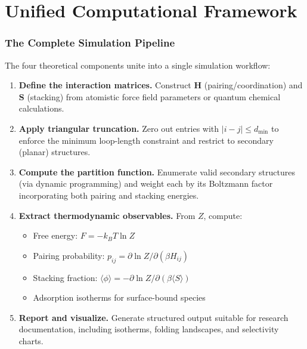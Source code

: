 \documentclass[11pt]{article}
\begin{document}
\part{Unified Computational Framework}

\section{The Complete Simulation Pipeline}

The four theoretical components unite into a single simulation workflow:

\begin{enumerate}
  \item \textbf{Define the interaction matrices.}
        Construct $\mathbf{H}$ (pairing/coordination) and $\mathbf{S}$
        (stacking) from atomistic force field parameters or quantum
        chemical calculations.

  \item \textbf{Apply triangular truncation.}
        Zero out entries with $|i - j| \leq d_{\min}$ to enforce the
        minimum loop-length constraint and restrict to secondary
        (planar) structures.

  \item \textbf{Compute the partition function.}
        Enumerate valid secondary structures (via dynamic programming)
        and weight each by its Boltzmann factor incorporating both
        pairing and stacking energies.

  \item \textbf{Extract thermodynamic observables.}
        From $Z$, compute:
        \begin{itemize}
          \item Free energy: $F = -k_B T \ln Z$
          \item Pairing probability: $p_{ij} = \partial \ln Z / \partial(\beta H_{ij})$
          \item Stacking fraction: $\langle \phi \rangle = -\partial \ln Z / \partial(\beta \langle S \rangle)$
          \item Adsorption isotherms for surface-bound species
        \end{itemize}

  \item \textbf{Report and visualize.}
        Generate structured output suitable for research documentation,
        including isotherms, folding landscapes, and selectivity charts.
\end{enumerate}
\end{document}
